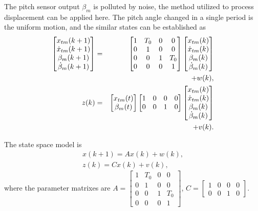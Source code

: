 The pitch sensor output $\beta_m$ is polluted by noise, the method
utilized to process displacement can be applied here. The pitch
angle changed in a single period is the uniform motion, and the similar
states can be established as
\begin{eqnarray}
  \begin{bmatrix}
    x_{tm}(k+1) \\
    \dot{x}_{tm}(k+1) \\
    \beta_m(k+1) \\
    \dot{\beta}_m(k+1)
  \end{bmatrix}
  &=&
  \begin{bmatrix}
    1 & T_0 & 0 & 0 \\
    0 & 1 & 0 & 0 \\
    0 & 0 & 1 & T_0 \\
    0 & 0 & 0 & 1
  \end{bmatrix}
  \begin{bmatrix}
    x_{tm}(k) \\
    \dot{x}_{tm}(k) \\
    \beta_m(k) \\
    \dot{\beta}_m(k)
  \end{bmatrix} \notag\\
  &&+ w(k), \\
  z(k) &=&
  \begin{bmatrix}
    x_{tm}(t) \\
    \beta_m(t)
  \end{bmatrix}
  \begin{bmatrix}
    1 & 0 & 0 & 0 \\
    0 & 0 & 1 & 0
  \end{bmatrix}
  \begin{bmatrix}
    x_{tm}(k) \\
    \dot{x}_{tm}(k) \\
    \beta_m(k) \\
    \dot{\beta}_m(k)
  \end{bmatrix} \notag\\
  &&+ v(k).
\end{eqnarray}

The state space model is
\begin{eqnarray}
  x(k+1) = Ax(k) + w(k), \\
  z(k) = C x(k) + v(k),
\end{eqnarray}
where the parameter matrixes are
$  A = \begin{bmatrix}
    1 & T_0 & 0 & 0 \\
    0 & 1 & 0 & 0 \\
    0 & 0 & 1 & T_0 \\
    0 & 0 & 0 & 1
  \end{bmatrix}$,
  $C =   \begin{bmatrix}
    1 & 0 & 0 & 0 \\
    0 & 0 & 1 & 0
  \end{bmatrix}$.

